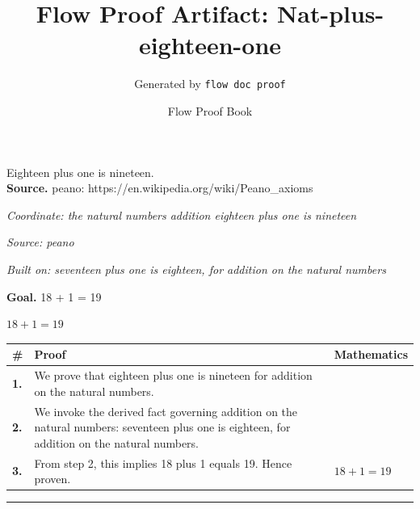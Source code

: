 \documentclass[11pt]{article}
\title{Flow Proof Artifact: Nat-plus-eighteen-one}
\author{Generated by \texttt{flow doc proof}}
\date{Flow Proof Book}
\theoremstyle{definition}
\begin{document}
\maketitle
Eighteen plus one is nineteen.\\[0.5em]
\textbf{Source.} peano: https://en.wikipedia.org/wiki/Peano\_axioms\\[0.5em]
\bigskip
{}\par
\smallskip\noindent\textit{Coordinate: the natural numbers \cdot addition \cdot eighteen plus one is nineteen}\par
\smallskip\noindent\textit{Source: peano}\par
\smallskip\noindent\textit{Built on: seventeen plus one is eighteen, for addition on the natural numbers}\par
\medskip
\noindent\textbf{Goal.} 18 + 1 = 19\par
\noindent$\displaystyle 18 + 1 = 19$\par
\medskip
\noindent
\begin{tabular}{@{} >{\raggedright\arraybackslash}p{} >{\raggedright\arraybackslash}p{} >{\raggedleft\arraybackslash}p{} @{}}
\textbf{\#} & \textbf{Proof} & \textbf{Mathematics} \\
\midrule
\textbf{1.} & We prove that eighteen plus one is nineteen for addition on the natural numbers. & \\[0.45em]
\textbf{2.} & We invoke the derived fact governing addition on the natural numbers: seventeen plus one is eighteen, for addition on the natural numbers. & \\[0.45em]
\textbf{3.} & From step 2, this implies 18 plus 1 equals 19. Hence proven. & $\displaystyle 18 + 1 = 19$ \\[0.45em]
\bottomrule
\end{tabular}
\label{thm:Nat-addition-eighteen_plus_one_is_nineteen}
\par\medskip\hrule
\end{document}
